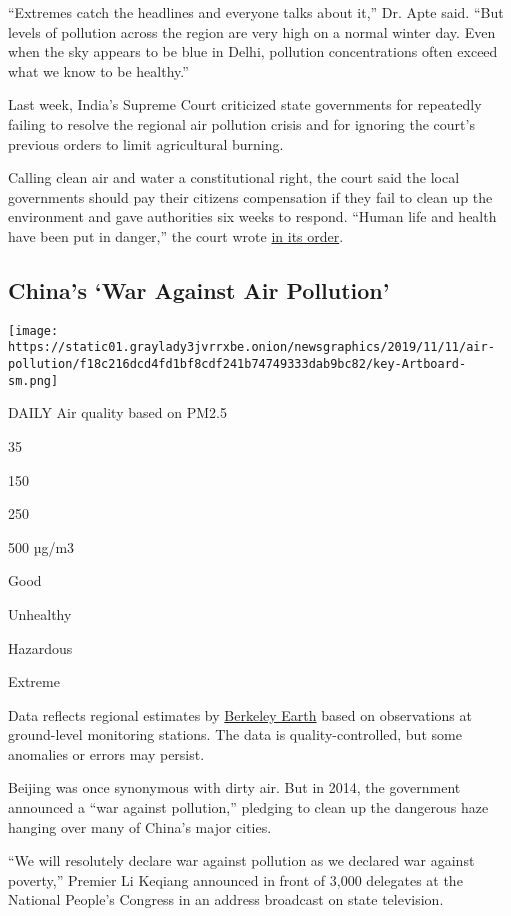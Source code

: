 ``Extremes catch the headlines and everyone talks about it,'' Dr. Apte
said. ``But levels of pollution across the region are very high on a
normal winter day. Even when the sky appears to be blue in Delhi,
pollution concentrations often exceed what we know to be healthy.''

Last week, India's Supreme Court criticized state governments for
repeatedly failing to resolve the regional air pollution crisis and for
ignoring the court's previous orders to limit agricultural burning.

Calling clean air and water a constitutional right, the court said the
local governments should pay their citizens compensation if they fail to
clean up the environment and gave authorities six weeks to respond.
``Human life and health have been put in danger,'' the court wrote
\href{http://www.indiaenvironmentportal.org.in/files/file/air-pollution-India-SC_Order_25-Nov-2019.pdf}{in
its order}.

\hypertarget{chinas-war-against-air-pollution}{%
\subsection{China's `War Against Air
Pollution'}\label{chinas-war-against-air-pollution}}

\texttt{[image: https://static01.graylady3jvrrxbe.onion/newsgraphics/2019/11/11/air-pollution/f18c216dcd4fd1bf8cdf241b74749333dab9bc82/key-Artboard-sm.png]}

DAILY Air quality based on PM2.5

35

150

250

500 µg/m3

Good

Unhealthy

Hazardous

Extreme

Data reflects regional estimates by
\href{http://berkeleyearth.org/air-quality-real-time-map/}{Berkeley
Earth} based on observations at ground-level monitoring stations. The
data is quality-controlled, but some anomalies or errors may persist.

Beijing was once synonymous with dirty air. But in 2014, the government
announced a ``war against pollution,'' pledging to clean up the
dangerous haze hanging over many of China's major cities.

``We will resolutely declare war against pollution as we declared war
against poverty,'' Premier Li Keqiang announced in front of 3,000
delegates at the National People's Congress in an address broadcast on
state television.

